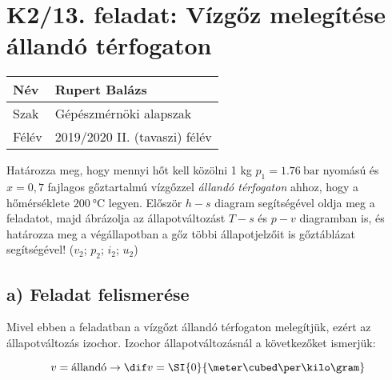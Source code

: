 \newcommand\pegy{0.176} %
\newcommand\TegyK{389.34} %
\newcommand\TegyC{116.19} %
\newcommand\vegy{0.699}
\newcommand\uegy{1913.2}
\newcommand\hegy{2036.3}
\newcommand\segy{5.4645}
\newcommand\xegy{0.7}
\newcommand\pvesszo{0.2575}
\newcommand\TvesszoK{401.52}
\newcommand\TvesszoC{128.37}
\newcommand\vvesszo{0.699}
\newcommand\uvesszo{2537.3}
\newcommand\hvesszo{2717.3}
\newcommand\svesszo{7.0419}
\newcommand\xvesszo{1}
\newcommand\pketto{0.3073}
\newcommand\TkettoK{473.15}
\newcommand\TkettoC{200}
\newcommand\vketto{0.699}
\newcommand\uketto{2649.5}
\newcommand\hketto{2864.3}
\newcommand\sketto{7.2992}

\newcommand\pontvastagsag{0.7 mm} %

\section*{K2/13. feladat: Vízgőz melegítése állandó térfogaton}
\begin{tabular}{ | p{2cm} | p{14cm} | } 
	\hline
	Név & Rupert Balázs \\ 
	\hline
	Szak & Gépészmérnöki alapszak\\ 
	\hline
	Félév & 2019/2020 II. (tavaszi) félév \\ 
	\hline
\end{tabular}
\vspace{0.5cm}

	Határozza meg, hogy mennyi hőt kell közölni 1 kg $p_1=\SI{1,76}{\bar}$ nyomású és $x = 0,7$ fajlagos gőztartalmú vízgőzzel \textit{állandó térfogaton} ahhoz, hogy a hőmérséklete $\SI{200}{\celsius}$ legyen. Először $h-s$ diagram segítségével oldja meg a feladatot, majd ábrázolja az állapotváltozást $T-s$ és $p-v$ diagramban is, és határozza meg a végállapotban a gőz többi állapotjelzőit is gőztáblázat segítségével! ($v_2$; $p_2$; $i_2$; $u_2$)
	\vspace{2mm}

\subsection*{a) Feladat felismerése}
	Mivel ebben a feladatban a vízgőzt állandó térfogaton melegítjük, ezért az állapotváltozás izochor.
	Izochor állapotváltozásnál a következőket ismerjük:
	
\begin{equation}
	v=\textrm{állandó} \rightarrow \dif v=\SI{0}{\meter\cubed\per\kilo\gram}
\end{equation}

